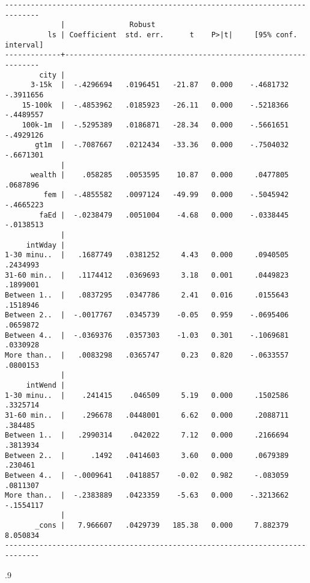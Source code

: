 \documentclass[10pt, letterpaper]{article}
\begin{document}
\begin{spacing}{1.4}
\begin{spacing}{.5}
\begin{scriptsize}
\begin{verbatim}
------------------------------------------------------------------------------
             |               Robust
          ls | Coefficient  std. err.      t    P>|t|     [95% conf. interval]
-------------+----------------------------------------------------------------
        city |
      3-15k  |  -.4296694   .0196451   -21.87   0.000    -.4681732   -.3911656
    15-100k  |  -.4853962   .0185923   -26.11   0.000    -.5218366   -.4489557
    100k-1m  |  -.5295389   .0186871   -28.34   0.000    -.5661651   -.4929126
       gt1m  |  -.7087667   .0212434   -33.36   0.000    -.7504032   -.6671301
             |
      wealth |    .058285   .0053595    10.87   0.000     .0477805    .0687896
         fem |  -.4855582   .0097124   -49.99   0.000    -.5045942   -.4665223
        faEd |  -.0238479   .0051004    -4.68   0.000    -.0338445   -.0138513
             |
     intWday |
1-30 minu..  |   .1687749   .0381252     4.43   0.000     .0940505    .2434993
31-60 min..  |   .1174412   .0369693     3.18   0.001     .0449823    .1899001
Between 1..  |   .0837295   .0347786     2.41   0.016     .0155643    .1518946
Between 2..  |  -.0017767   .0345739    -0.05   0.959    -.0695406    .0659872
Between 4..  |  -.0369376   .0357303    -1.03   0.301    -.1069681    .0330928
More than..  |   .0083298   .0365747     0.23   0.820    -.0633557    .0800153
             |
     intWend |
1-30 minu..  |    .241415    .046509     5.19   0.000     .1502586    .3325714
31-60 min..  |    .296678   .0448001     6.62   0.000     .2088711     .384485
Between 1..  |   .2990314    .042022     7.12   0.000     .2166694    .3813934
Between 2..  |      .1492   .0414603     3.60   0.000     .0679389     .230461
Between 4..  |  -.0009641   .0418857    -0.02   0.982     -.083059    .0811307
More than..  |  -.2383889   .0423359    -5.63   0.000    -.3213662   -.1554117
             |
       _cons |   7.966607   .0429739   185.38   0.000     7.882379    8.050834
------------------------------------------------------------------------------
\end{verbatim}
\end{scriptsize}
\end{spacing}{.9}





\end{spacing}
\end{document}
